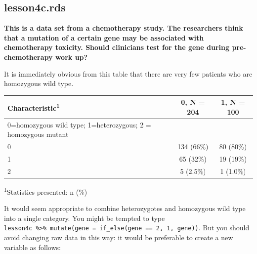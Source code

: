 \documentclass[]{book}
\newenvironment{Shaded}{\begin{snugshade}}{\end{snugshade}}
\newcommand{\DataTypeTok}[1]{\textcolor[rgb]{0.13,0.29,0.53}{#1}}
\newcommand{\DecValTok}[1]{\textcolor[rgb]{0.00,0.00,0.81}{#1}}
\newcommand{\KeywordTok}[1]{\textcolor[rgb]{0.13,0.29,0.53}{\textbf{#1}}}
\newcommand{\NormalTok}[1]{#1}
\newcommand{\OperatorTok}[1]{\textcolor[rgb]{0.81,0.36,0.00}{\textbf{#1}}}
\newcommand{\StringTok}[1]{\textcolor[rgb]{0.31,0.60,0.02}{#1}}
\begin{document}
\hypertarget{lesson4c.rds}{%
\subsection{lesson4c.rds}\label{lesson4c.rds}}

\textbf{This is a data set from a chemotherapy study. The researchers think that a mutation of a certain gene may be associated with chemotherapy toxicity. Should clinicians test for the gene during pre-chemotherapy work up?}

It is immediately obvious from this table that there are very few patients who are homozygous wild type.

\begin{Shaded}
\end{Shaded}

\captionsetup[table]{labelformat=empty,skip=1pt}
\begin{longtable}{lcc}
\toprule
\textbf{Characteristic}\textsuperscript{1} & \textbf{0}, N = 204 & \textbf{1}, N = 100 \\ 
\midrule
0=homozygous wild type; 1=heterozygous; 2 = homozygous mutant &  &  \\ 
0 & 134 (66\%) & 80 (80\%) \\ 
1 & 65 (32\%) & 19 (19\%) \\ 
2 & 5 (2.5\%) & 1 (1.0\%) \\ 
\bottomrule
\end{longtable}
\vspace{-5mm}
\begin{minipage}{\linewidth}
\textsuperscript{1}Statistics presented: n (\%) \\ 
\end{minipage}

It would seem appropriate to combine heterozygotes and homozygous wild type into a single category. You might be tempted to type \texttt{lesson4c\ \%\textgreater{}\%\ mutate(gene\ =\ if\_else(gene\ ==\ 2,\ 1,\ gene))}. But you should avoid changing raw data in this way: it would be preferable to create a new variable as follows:

\begin{Shaded}
\end{Shaded}
\end{document}
